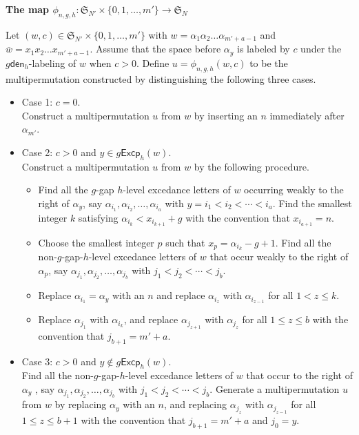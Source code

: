 \documentclass[12pt]{article}
\numberwithin{equation}{section}
\theoremstyle{plain}
\def\den{\mathsf{den}}
\def\Excp{\mathsf{Excp}}
\begin{document}
 \begin{framed}
	\begin{center}
		{\bf The map $\phi_{n,g, h}:\mathfrak{S}_{N'}\times  \{0,1,\ldots, m'\}\longrightarrow \mathfrak{S}_{N}$ }
	\end{center}
	Let $(w, c)\in  \mathfrak{S}_{N'}\times\{0, 1, \ldots, m'\} $ with $w=\alpha_1\alpha_2\ldots \alpha_{m'+a-1}$ and $\bar{w}=x_1x_2\ldots x_{m'+a-1}$.     Assume that the space before $\alpha_y$ is labeled by $c$ under the $g\den_h$-labeling of $w$ when $c>0$.  
	Define  $u=\phi_{n,g,h}(w, c)$ to be the multipermutation   constructed by distinguishing the following three cases. 
	\begin{itemize}
		\item Case 1: $c=0$. \\
	Construct   a multipermutation    $u$  from $w$ by inserting  an $n$  immediately after   $\alpha_{m'}$. 
		
		
		
		
		\item Case 2:   $c>0$ and $y\in g\Excp_h(w)$.   \\
		Construct   a multipermutation    $u$  from $w$ by the following procedure.
		\begin{itemize}
	 \item  Find all the $g$-gap $h$-level excedance letters   of $w$  occurring      weakly to the right of   $\alpha_y$,  say
	 $\alpha_{i_1}, \alpha_{i_2}, \ldots, \alpha_{i_a}$ with
	  $ y=i_1<i_2<\cdots <i_a$. Find the smallest  integer $k$ satisfying $\alpha_{i_k}< x_{i_{k+1}}+g$   with the convention that $x_{i_{a+1}}=n$.
		\item    
	Choose the smallest integer  $p$ such that $x_p=\alpha_{i_k}-g+1$.	Find all the  non-$g$-gap-$h$-level excedance letters of $w$ that occur   weakly   to  the right  of $\alpha_{p}$, say $\alpha_{j_1}, \alpha_{j_2}, \ldots, \alpha_{j_b}$ with $ j_1<j_2<\cdots<j_b$.    
			\item   Replace  $\alpha_{i_1}=\alpha_y$ with an  $n$ and replace   $\alpha_{i_{z}}$  with $\alpha_{i_{z-1}}$  for all $1< z\leq k$. 
			
			\item  Replace  $\alpha_{j_1}$ with $\alpha_{i_k}$,  and  replace  $\alpha_{j_{z+1}}$ with $\alpha_{j_{z}}$ for all $1\leq z\leq b $  with the convention that $j_{b+1}=m'+a$.   
		 \end{itemize}
		 
		 	\item Case 3:   $c>0$ and  $y\notin g\Excp_h(w)$. \\ 
		 Find all the  non-$g$-gap-$h$-level excedance letters of $w$ that occur    to  the right  of $\alpha_{y}$ , say $\alpha_{j_1}, \alpha_{j_2}, \ldots, \alpha_{j_b}$ with $ j_1<j_2<\cdots<j_b$.   Generate  a multipermutation $u$ from $w$ by  replacing $\alpha_{y}$ with an  $n$,   and replacing $\alpha_{j_{z}}$ with $\alpha_{j_{z-1}}$ for all $1\leq z\leq b+1 $ with the convention that $j_{b+1}=m'+a$ and $j_0=y$.
		 
	\end{itemize}
	
	

	
\end{framed}
\end{document}
